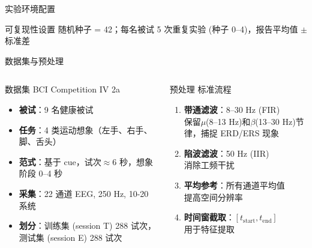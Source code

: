 {\begin{frame}{实验环境配置}
    \begin{block}{可复现性设置}
        \footnotesize
        随机种子 = 42；每名被试 5 次重复实验 (种子 0--4)，报告平均值 $\pm$ 标准差
    \end{block}
\end{frame}

\begin{frame}{数据集与预处理}
    \begin{columns}[T]
        \begin{block}{数据集}
            \footnotesize
            BCI Competition IV 2a \cite{tangermann2012review}
            \begin{itemize}
                \item \textbf{被试}：9 名健康被试
                \item \textbf{任务}：4 类运动想象（左手、右手、脚、舌头）
                \item \textbf{范式}：基于 cue，试次$\approx$6 秒，想象阶段 0--4 秒
                \item \textbf{采集}：22 通道 EEG, 250 Hz, 10-20 系统
                \item \textbf{划分}：训练集 (session T) 288 试次，测试集 (session E) 288 试次
            \end{itemize}
        \end{block}

        \begin{block}{预处理}
            \footnotesize
            标准流程\cite{delorme2004eeglab}
            \begin{enumerate}
                \item \textbf{带通滤波}：8--30 Hz (FIR)\\保留$\mu$(8--13 Hz)和$\beta$(13--30 Hz)节律，捕捉 ERD/ERS 现象\cite{pfurtscheller1999event}
                \item \textbf{陷波滤波}：50 Hz (IIR)\\消除工频干扰
                \item \textbf{平均参考}：所有通道平均值\\提高空间分辨率
                \item \textbf{时间窗截取}：$[t_{\text{start}}, t_{\text{end}}]$\\用于特征提取
            \end{enumerate}
        \end{block}
    \end{columns}
\end{frame}

}
